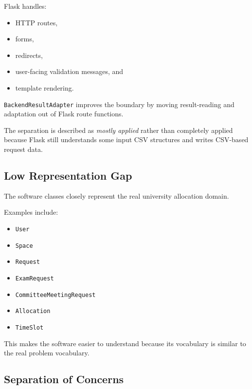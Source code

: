 \documentclass[12pt,a4paper]{article}
\begin{document}
Flask handles:

\begin{itemize}
    \item HTTP routes,
    \item forms,
    \item redirects,
    \item user-facing validation messages, and
    \item template rendering.
\end{itemize}

\texttt{BackendResultAdapter} improves the boundary by moving result-reading
and adaptation out of Flask route functions.

The separation is described as \emph{mostly applied} rather than completely
applied because Flask still understands some input CSV structures and writes
CSV-based request data.

\subsection{Low Representation Gap}

The software classes closely represent the real university allocation domain.

Examples include:

\begin{itemize}
    \item \texttt{User}
    \item \texttt{Space}
    \item \texttt{Request}
    \item \texttt{ExamRequest}
    \item \texttt{CommitteeMeetingRequest}
    \item \texttt{Allocation}
    \item \texttt{TimeSlot}
\end{itemize}

This makes the software easier to understand because its vocabulary is similar
to the real problem vocabulary.

\subsection{Separation of Concerns}
\end{document}
